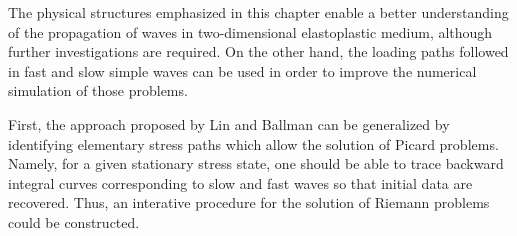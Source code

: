 



The physical structures emphasized in this chapter enable a better understanding of the propagation of waves in two-dimensional elastoplastic medium, although further investigations are required.
On the other hand, the loading paths followed in fast and slow simple waves can be used in order to improve the numerical simulation of those problems.

First, the approach proposed by Lin and Ballman \cite{Lin_et_Ballman} can be generalized by identifying elementary stress paths which allow the solution of Picard problems.
Namely, for a given stationary stress state, one should be able to trace backward integral curves corresponding to slow and fast waves so that initial data are recovered.
Thus, an interative procedure for the solution of Riemann problems could be constructed.

